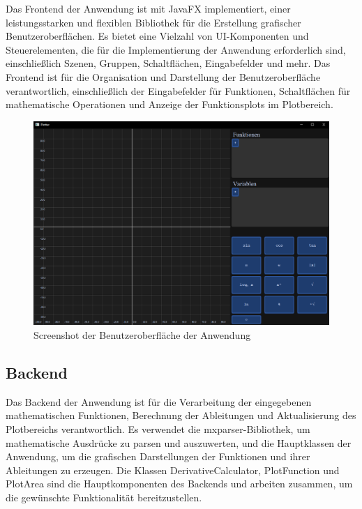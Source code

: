 \documentclass[a4paper]{article}
\begin{document}
Das Frontend der Anwendung ist mit JavaFX implementiert, einer leistungsstarken und flexiblen Bibliothek für die Erstellung grafischer Benutzeroberflächen. Es bietet eine Vielzahl von UI-Komponenten und Steuerelementen, die für die Implementierung der Anwendung erforderlich sind, einschließlich Szenen, Gruppen, Schaltflächen, Eingabefelder und mehr. Das Frontend ist für die Organisation und Darstellung der Benutzeroberfläche verantwortlich, einschließlich der Eingabefelder für Funktionen, Schaltflächen für mathematische Operationen und Anzeige der Funktionsplots im Plotbereich.

\begin{figure}[h]
	\centering
	\includegraphics[width=\textwidth]{Resources/gui_screenshot.png}
	\caption{Screenshot der Benutzeroberfläche der Anwendung}
	\label{fig:gui_screenshot}
\end{figure}

\newpage

\subsection{Backend}

Das Backend der Anwendung ist für die Verarbeitung der eingegebenen mathematischen Funktionen, Berechnung der Ableitungen und Aktualisierung des Plotbereichs verantwortlich. Es verwendet die mxparser-Bibliothek, um mathematische Ausdrücke zu parsen und auszuwerten, und die Hauptklassen der Anwendung, um die grafischen Darstellungen der Funktionen und ihrer Ableitungen zu erzeugen. Die Klassen DerivativeCalculator, PlotFunction und PlotArea sind die Hauptkomponenten des Backends und arbeiten zusammen, um die gewünschte Funktionalität bereitzustellen.
\end{document}
